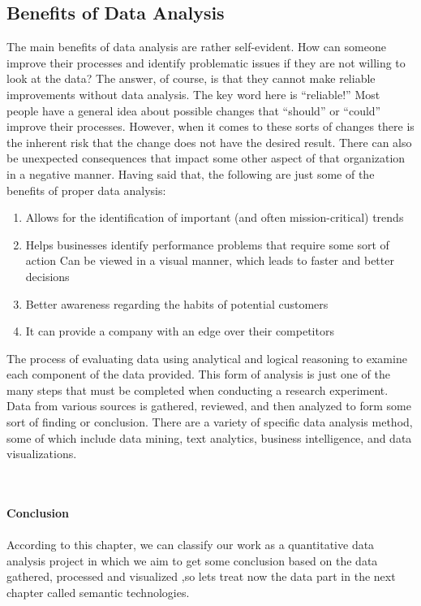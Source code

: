 \documentclass[a4paper,12pt,oneside]{report}
\begin{document}
{\subsection{Benefits of Data Analysis}
{The main benefits of data analysis are rather self-evident. How can someone improve their processes and identify problematic issues if they are not willing to look at the data? The answer, of course, is that they cannot make reliable improvements without data analysis. The key word here is “reliable!” Most people have a general idea about possible changes that “should” or “could” improve their processes. However, when it comes to these sorts of changes there is the inherent risk that the change does not have the desired result. There can also be unexpected consequences that impact some other aspect of that organization in a negative manner. Having said that, the following are just some of the benefits of proper data analysis:
\begin{enumerate}
\item {Allows for the identification of important (and often mission-critical) trends}
\item {Helps businesses identify performance problems that require some sort of action Can be viewed in a visual manner, which leads to faster and better decisions}
\item {Better awareness regarding the habits of potential customers}
\item{It can provide a company with an edge over their competitors}
\end{enumerate} 
The process of evaluating data using analytical and logical reasoning to examine each component of the data provided. This form of analysis is just one of the many steps that must be completed when conducting a research experiment. Data from various sources is gathered, reviewed, and then analyzed to form some sort of finding or conclusion. There are a variety of specific data analysis method, some of which include data mining, text analytics, business intelligence, and data visualizations.}\\ \\
\textbf{\large Conclusion}\\ \\

{According to this chapter, we can classify our work as a quantitative data analysis project in which we aim to get some conclusion based on the data gathered, processed and visualized ,so lets treat now the data part in the next chapter called semantic technologies.}
}
\end{document}
